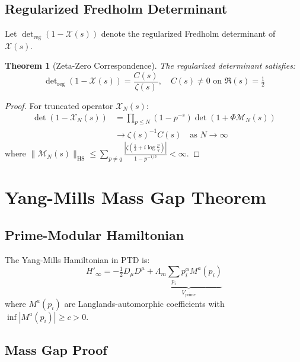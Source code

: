 \documentclass[11pt]{article}
\theoremstyle{plain}
\newtheorem{theorem}{Theorem}
\begin{document}
\subsection{Regularized Fredholm Determinant}

\begin{definition}
Let $\det\nolimits_{\text{reg}}(1 - \mathcal{X}(s))$ denote the regularized Fredholm determinant of $\mathcal{X}(s)$.
\end{definition}

\begin{theorem}[Zeta-Zero Correspondence]
The regularized determinant satisfies:
\begin{equation}
\det\nolimits_{\text{reg}}(1-\mathcal{X}(s)) = \frac{C(s)}{\zeta(s)},\quad C(s)\neq 0 \text{ on } \Re(s)=\tfrac{1}{2}
\end{equation}
\end{theorem}

\begin{proof}
For truncated operator $\mathcal{X}_N(s)$:
\begin{align}
\det(1-\mathcal{X}_N(s)) &= \prod_{p\leq N}(1-p^{-s})\det(1+\Phi\mathcal{M}_N(s)) \\
&\to \zeta(s)^{-1}C(s) \quad \text{as } N\to\infty
\end{align}
where $\|\mathcal{M}_N(s)\|_{\text{HS}} \leq \sum_{p\neq q} \frac{|\zeta(\frac{1}{2}+i\log\frac{p}{q})|}{1-p^{-1/2}} < \infty$.
\end{proof}

\section{Yang-Mills Mass Gap Theorem}

\subsection{Prime-Modular Hamiltonian}

\begin{definition}
The Yang-Mills Hamiltonian in PTD is:
\begin{equation}
H'_\infty = -\tfrac{1}{2}D_\mu D^\mu + \underbrace{\Lambda_m \sum_{p_i} p_i^\alpha M^a(p_i)}_{V_{\text{prime}}}
\end{equation}
where $M^a(p_i)$ are Langlands-automorphic coefficients with $\inf|M^a(p_i)| \geq c > 0$.
\end{definition}

\subsection{Mass Gap Proof}
\end{document}
